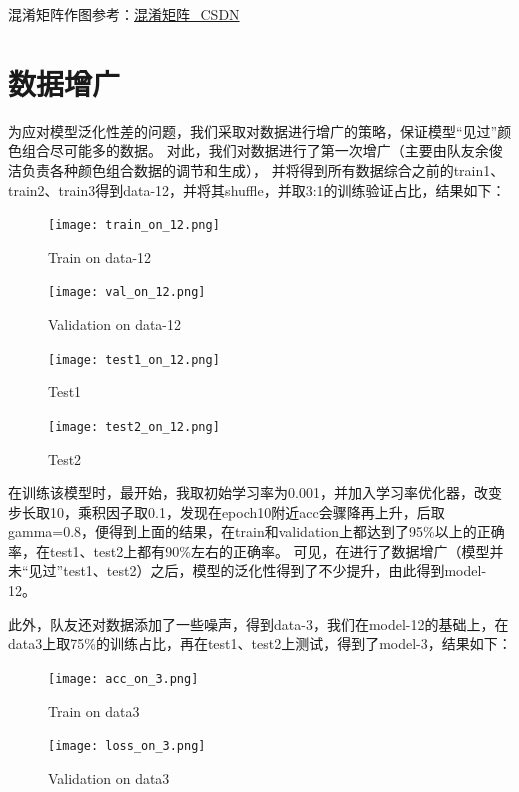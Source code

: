 \documentclass[12pt, a4paper, oneside]{ctexart}
\begin{document}
混淆矩阵作图参考：\href{https://blog.csdn.net/ZhangYuq16/article/details/97960165}{混淆矩阵\_CSDN}

\section{数据增广}
为应对模型泛化性差的问题，我们采取对数据进行增广的策略，保证模型“见过”颜色组合尽可能多的数据。
对此，我们对数据进行了第一次增广（主要由队友余俊洁负责各种颜色组合数据的调节和生成），
并将得到所有数据综合之前的train1、train2、train3得到data-12，并将其shuffle，并取3:1的训练验证占比，结果如下：
\begin{figure}[H]
    \centering
    \texttt{[image: train\_on\_12.png]}
    \caption{Train on data-12}
\end{figure}
\begin{figure}[H]
    \centering
    \texttt{[image: val\_on\_12.png]}
    \caption{Validation on data-12}
\end{figure}
\begin{figure}[H]  
    \begin{minipage}[H]{0.5\linewidth} %
            \centering
            \texttt{[image: test1\_on\_12.png]}
            \caption{Test1}
     \end{minipage}
     \begin{minipage}[H]{0.5\linewidth} %
         \hspace{2mm}%
         \texttt{[image: test2\_on\_12.png]}
         \caption{Test2}
      \end{minipage}
\end{figure}
在训练该模型时，最开始，我取初始学习率为0.001，并加入学习率优化器，改变步长取10，乘积因子取0.1，发现在epoch10附近acc会骤降再上升，后取gamma=0.8，便得到上面的结果，在train和validation上都达到了95\%以上的正确率，在test1、test2上都有90\%左右的正确率。
可见，在进行了数据增广（模型并未“见过”test1、test2）之后，模型的泛化性得到了不少提升，由此得到model-12。

此外，队友还对数据添加了一些噪声，得到data-3，我们在model-12的基础上，在data3上取75\%的训练占比，再在test1、test2上测试，得到了model-3，结果如下：
\begin{figure}[H]  
    \begin{minipage}[H]{0.5\linewidth} %
            \centering
            \texttt{[image: acc\_on\_3.png]}
            \caption{Train on data3}
     \end{minipage}
     \begin{minipage}[H]{0.5\linewidth} %
         \hspace{2mm}%
         \texttt{[image: loss\_on\_3.png]}
         \caption{Validation on data3}
      \end{minipage}
\end{figure}
\end{document}

